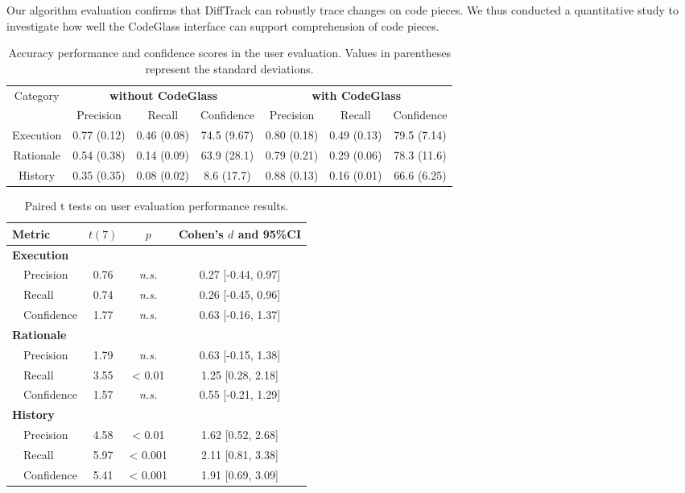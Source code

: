 Our algorithm evaluation confirms that DiffTrack can robustly trace changes on code pieces.
We thus conducted a quantitative study to investigate how well the CodeGlass interface can support comprehension of code pieces. 

\begin{table*}[t]
    \centering
    \begin{tabular}{c||ccc|ccc}
    \multirow{2}{*}{Category} & \multicolumn{3}{c|}{\textbf{without CodeGlass}} & \multicolumn{3}{c}{\textbf{with CodeGlass}} \\
     & Precision & Recall & Confidence & Precision & Recall & Confidence \\ \hline \hline
     Execution & 0.77 (0.12) & 0.46 (0.08) & 74.5 (9.67) & 0.80 (0.18) & 0.49 (0.13) & 79.5 (7.14) \\
     Rationale & 0.54 (0.38) & 0.14 (0.09) & 63.9 (28.1) & 0.79 (0.21) & 0.29 (0.06) & 78.3 (11.6) \\
     History & 0.35 (0.35) & 0.08 (0.02) & 8.6 (17.7) & 0.88 (0.13) & 0.16 (0.01) & 66.6 (6.25) \\ 
    \end{tabular}
    \caption{Accuracy performance and confidence scores in the user evaluation. Values in parentheses represent the standard deviations.}
    \label{table:experiment_result}
    \vspace{-2mm}
\end{table*}

\begin{table}[t]
    \centering
    \begin{tabular}{rl||ccc}
    \multicolumn{2}{l||}{Metric} & $t(7)$ & $p$ & Cohen's $d$ and 95\%CI \\ \hline \hline
    \multicolumn{2}{l||}{\textbf{Execution}} & & & \\
    & Precision & 0.76 & \textit{n.s.}%
    & 0.27 [-0.44, 0.97] \\
    & Recall & 0.74 & \textit{n.s.}%
    & 0.26 [-0.45, 0.96] \\
    & Confidence & 1.77 & \textit{n.s.}%
    & 0.63 [-0.16, 1.37] \\ \hline
    \multicolumn{2}{l||}{\textbf{Rationale}} & & & \\
    & Precision & 1.79 & \textit{n.s.}%
    & 0.63 [-0.15, 1.38] \\
    & Recall & 3.55 & < 0.01 & 1.25 [0.28, 2.18] \\
    & Confidence & 1.57 & \textit{n.s.}%
    & 0.55 [-0.21, 1.29]\\ \hline
    \multicolumn{2}{l||}{\textbf{History}} & & & \\
    & Precision & 4.58 & < 0.01 & 1.62 [0.52, 2.68] \\
    & Recall & 5.97 & < 0.001 & 2.11 [0.81, 3.38] \\
    & Confidence & 5.41 & < 0.001 & 1.91 [0.69, 3.09] \\ 
    \end{tabular}
    \caption{Paired t tests on user evaluation performance results.}
    \label{table:stats_result}
    \vspace{-2mm}
\end{table}


